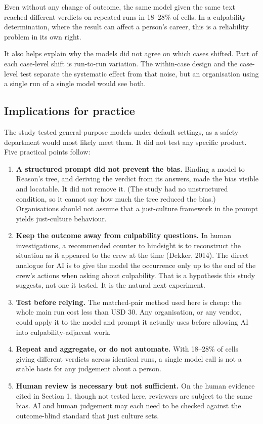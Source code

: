 \documentclass[review,12pt]{elsarticle}
\providecommand{\tightlist}{\setlength{\itemsep}{0pt}\setlength{\parskip}{0pt}}
\begin{document}
Even without any change of outcome, the same model given the same text reached different verdicts on repeated runs in 18--28\% of cells. In a culpability determination, where the result can affect a person's career, this is a reliability problem in its own right.

It also helps explain why the models did not agree on which cases shifted. Part of each case-level shift is run-to-run variation. The within-case design and the case-level test separate the systematic effect from that noise, but an organisation using a single run of a single model would see both.

\hypertarget{implications-for-practice}{%
\subsection{Implications for practice}\label{implications-for-practice}}

The study tested general-purpose models under default settings, as a safety department would most likely meet them. It did not test any specific product. Five practical points follow:

\begin{enumerate}
\def\labelenumi{\arabic{enumi}.}
\tightlist
\item
  \textbf{A structured prompt did not prevent the bias.} Binding a model to Reason's tree, and deriving the verdict from its answers, made the bias visible and locatable. It did not remove it. (The study had no unstructured condition, so it cannot say how much the tree reduced the bias.) Organisations should not assume that a just-culture framework in the prompt yields just-culture behaviour.
\item
  \textbf{Keep the outcome away from culpability questions.} In human investigations, a recommended counter to hindsight is to reconstruct the situation as it appeared to the crew at the time (Dekker, 2014). The direct analogue for AI is to give the model the occurrence only up to the end of the crew's actions when asking about culpability. That is a hypothesis this study suggests, not one it tested. It is the natural next experiment.
\item
  \textbf{Test before relying.} The matched-pair method used here is cheap: the whole main run cost less than USD 30. Any organisation, or any vendor, could apply it to the model and prompt it actually uses before allowing AI into culpability-adjacent work.
\item
  \textbf{Repeat and aggregate, or do not automate.} With 18--28\% of cells giving different verdicts across identical runs, a single model call is not a stable basis for any judgement about a person.
\item
  \textbf{Human review is necessary but not sufficient.} On the human evidence cited in Section 1, though not tested here, reviewers are subject to the same bias. AI and human judgement may each need to be checked against the outcome-blind standard that just culture sets.
\end{enumerate}
\end{document}
